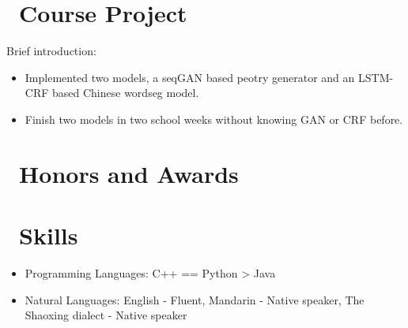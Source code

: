 \documentclass{resume}
\begin{document}
\section{\faUsers\ Course Project}
Brief introduction: 
\begin{itemize}
  \item Implemented two models, a seqGAN based peotry generator and an LSTM-CRF based Chinese wordseg model.
  \item Finish two models in two school weeks without knowing GAN or CRF before.
\end{itemize}

\section{\faHeartO\ Honors and Awards}

\section{\faCogs\ Skills}
\begin{itemize}[parsep=0.5ex]
  \item Programming Languages: C++ == Python > Java
  \item Natural Languages: English - Fluent, Mandarin - Native speaker, The Shaoxing dialect - Native speaker
\end{itemize}


%
%
\end{document}
